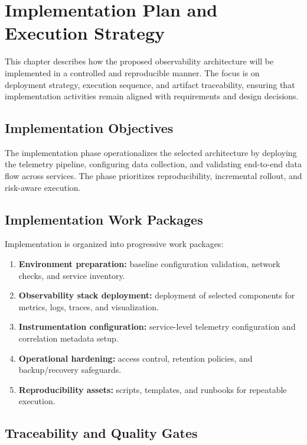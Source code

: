 \chapter{Implementation Plan and Execution Strategy}
\label{chap:implementation}

This chapter describes how the proposed observability architecture will be implemented in a controlled and reproducible manner. The focus is on deployment strategy, execution sequence, and artifact traceability, ensuring that implementation activities remain aligned with requirements and design decisions.

\section{Implementation Objectives}

The implementation phase operationalizes the selected architecture by deploying the telemetry pipeline, configuring data collection, and validating end-to-end data flow across services. The phase prioritizes reproducibility, incremental rollout, and risk-aware execution.

\section{Implementation Work Packages}

Implementation is organized into progressive work packages:
\begin{enumerate}
    \item \textbf{Environment preparation:} baseline configuration validation, network checks, and service inventory.
    \item \textbf{Observability stack deployment:} deployment of selected components for metrics, logs, traces, and visualization.
    \item \textbf{Instrumentation configuration:} service-level telemetry configuration and correlation metadata setup.
    \item \textbf{Operational hardening:} access control, retention policies, and backup/recovery safeguards.
    \item \textbf{Reproducibility assets:} scripts, templates, and runbooks for repeatable execution.
\end{enumerate}

\section{Traceability and Quality Gates}

